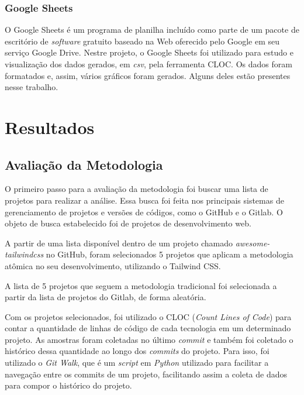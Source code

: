 \hypertarget{googlesheets}{%
\subsection{Google Sheets}\label{googlesheets}}

O Google Sheets é um programa de planilha incluído como parte de um pacote de escritório de \emph{software} gratuito baseado na Web oferecido pelo Google em seu serviço Google Drive. Nestre projeto, o Google Sheets foi utilizado para estudo e visualização dos dados gerados, em \emph{csv}, pela ferramenta CLOC. Os dados foram formatados e, assim, vários gráficos foram gerados. Alguns deles estão presentes nesse trabalho.

\newpage

\hypertarget{resultados}{%
\chapter{Resultados}\label{resultados}}

\hypertarget{avaliacao}{%
\section{Avaliação da Metodologia}\label{avaliacao}}

O primeiro passo para a avaliação da metodologia foi buscar uma lista de projetos para realizar a análise. Essa busca foi feita nos principais sistemas de gerenciamento de projetos e versões de códigos, como o GitHub e o Gitlab. O objeto de busca estabelecido foi de projetos de desenvolvimento web.

A partir de uma lista disponível dentro de um projeto chamado \emph{awesome-tailwindcss}\nocite{githublist} no GitHub, foram selecionados 5 projetos que aplicam a metodologia atômica no seu desenvolvimento, utilizando o Tailwind CSS.

A lista de 5 projetos que seguem a metodologia tradicional foi selecionada a partir da lista de projetos do Gitlab, de forma aleatória.

Com os projetos selecionados, foi utilizado o CLOC (\emph{Count Lines of Code}) para contar a quantidade de linhas de código de cada tecnologia em um determinado projeto. As amostras foram coletadas no último \emph{commit} e também foi coletado o histórico dessa quantidade ao longo dos \emph{commits} do projeto. Para isso, foi utilizado o \emph{Git Walk}\nocite{gitwalk}, que é um \emph{script} em \emph{Python} utilizado para facilitar a navegação entre os commits de um projeto, facilitando assim a coleta de dados para compor o histórico do projeto.

